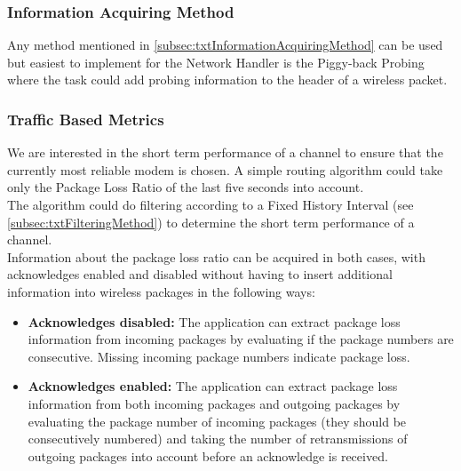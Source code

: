 \subsubsection{Information Acquiring Method}
Any method mentioned in \autoref{subsec:txtInformationAcquiringMethod} can be used but easiest to implement for the Network Handler is the Piggy-back Probing where the task could add probing information to the header of a wireless packet.
%
\subsubsection{Traffic Based Metrics}
We are interested in the short term performance of a channel to ensure that the currently most reliable modem is chosen. A simple routing algorithm could take only the Package Loss Ratio of the last five seconds into account. \\
The algorithm could do filtering according to a Fixed History Interval (see \autoref{subsec:txtFilteringMethod}) to determine the short term performance of a channel. \\
Information about the package loss ratio can be acquired in both cases, with acknowledges enabled and disabled without having to insert additional information into wireless packages in the following ways:
\begin{itemize}
    \item \textbf{Acknowledges disabled:} The application can extract package loss information from incoming packages by evaluating if the package numbers are consecutive. Missing incoming package numbers indicate package loss.
    \item \textbf{Acknowledges enabled:} The application can extract package loss information from both incoming packages and outgoing packages by evaluating the package number of incoming packages (they should be consecutively numbered) and taking the number of retransmissions of outgoing packages into account before an acknowledge is received.
\end{itemize}
%
